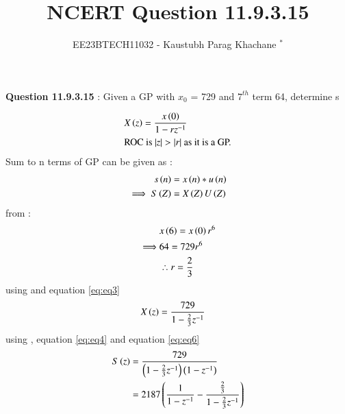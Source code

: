 \documentclass[journal,12pt,twocolumn]{IEEEtran}
\theoremstyle{remark}
\begin{document}

\vspace{3cm}

\Large\title{NCERT Question 11.9.3.15}
\large\author{EE23BTECH11032 - Kaustubh Parag Khachane $^{*}$%
}
\maketitle
\newpage
\bigskip

\renewcommand{\thefigure}{\theenumi}
\renewcommand{\thetable}{\theenumi}
\large\textbf{Question 11.9.3.15} : Given a GP with $x_0$ = 729 and \(7^{th}\) term 64, determine s

\solution


\begin{align}
   & X\left(z\right) = \frac{x\left(0\right)}{1 - rz^{-1}} \label{eq:eq3}\\
   & \text{ROC is $\left\vert z\right\vert > \left\vert r\right\vert$ as it is a GP.}   
\end{align}
 Sum to n terms of GP can be given as :
\begin{align}
    s\left(n\right) &= x\left(n\right)*u\left(n\right)\\
    \implies  S\left(Z\right) &= X\left(Z\right)U\left(Z\right)\label{eq:eq4}
\end{align}
from  :
\begin{align}
    &x\left(6\right) = x\left(0\right)r^6\\
    \implies &64 = 729r^6\\
    &\therefore r = \frac{2}{3}\label{eq:eq2}
\end{align}
using  and equation \eqref{eq:eq3}
\begin{align}
    X\left(z\right) &= \frac{729}{1 - \frac{2}{3}z^{-1}}\label{eq:eq6}
\end{align}
using , equation \eqref{eq:eq4} and equation \eqref{eq:eq6}
\begin{align}
    S\left(z\right) &= \frac{729}{\left(1 - \frac{2}{3}z^{-1}\right)\left(1-z^{-1}\right)}\\
    &= 2187\left(\frac{1}{1-z^{-1}} - \frac{\frac{2}{3}}{1 - \frac{2}{3}z^{-1}}\right) \label{eq:eq5}
\end{align}
\end{document}
